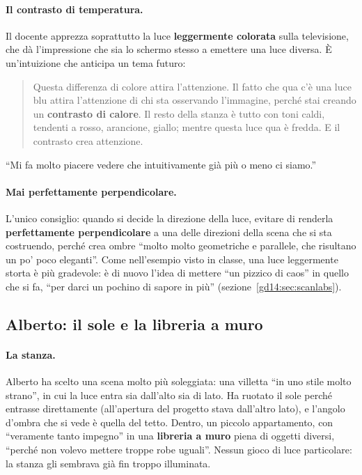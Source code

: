 \paragraph{Il contrasto di temperatura.} Il docente apprezza soprattutto la luce
\textbf{leggermente colorata} sulla televisione, che dà l'impressione che sia lo schermo
stesso a emettere una luce diversa. È un'intuizione che anticipa un tema futuro:
\begin{quote}
Questa differenza di colore attira l'attenzione. Il fatto che qua c'è una luce blu
attira l'attenzione di chi sta osservando l'immagine, perché stai creando un
\textbf{contrasto di calore}. Il resto della stanza è tutto con toni caldi, tendenti a
rosso, arancione, giallo; mentre questa luce qua è fredda. E il contrasto crea
attenzione.
\end{quote}
``Mi fa molto piacere vedere che intuitivamente già più o meno ci siamo.''

\paragraph{Mai perfettamente perpendicolare.} L'unico consiglio: quando si decide la
direzione della luce, evitare di renderla \textbf{perfettamente perpendicolare} a una
delle direzioni della scena che si sta costruendo, perché crea ombre ``molto molto
geometriche e parallele, che risultano un po' poco eleganti''. Come nell'esempio visto
in classe, una luce leggermente storta è più gradevole: è di nuovo l'idea di mettere
``un pizzico di caos'' in quello che si fa, ``per darci un pochino di sapore in
più'' (sezione~\ref{gd14:sec:scanlabs}).

\subsection{Alberto: il sole e la libreria a muro}

\paragraph{La stanza.} Alberto ha scelto una scena molto più soleggiata: una villetta
``in uno stile molto strano'', in cui la luce entra sia dall'alto sia di lato. Ha
ruotato il sole perché entrasse direttamente (all'apertura del progetto stava
dall'altro lato), e l'angolo d'ombra che si vede è quella del tetto. Dentro, un
piccolo appartamento, con ``veramente tanto impegno'' in una \textbf{libreria a muro}
piena di oggetti diversi, ``perché non volevo mettere troppe robe uguali''. Nessun
gioco di luce particolare: la stanza gli sembrava già fin troppo illuminata.

